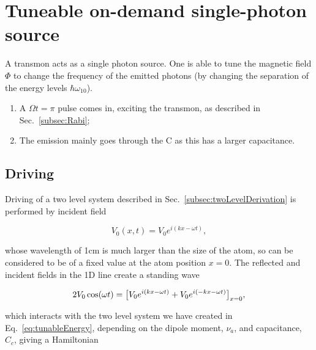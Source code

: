 \section{Tuneable on-demand single-photon source}

 A transmon acts as a single photon source. One is able to tune the magnetic field $ \Phi $ to change the frequency of the emitted photons (by changing the separation of the energy levels $ \hbar\omega_{10} $).

 \begin{enumerate}
 	\item A $ \Omega t = \pi $ pulse comes in, exciting the transmon, as described in Sec.~\ref{subsec:Rabi};
 	\item The emission mainly goes through the C as this has a larger capacitance.
  \end{enumerate}

 

\subsection{Driving}
 Driving of a two level system described in Sec.~\ref{subsec:twoLevelDerivation} is performed by incident field
 
 \[
 	V_0(x,t) = V_0e^{i(kx-\omega t)},
 \]
 
 \noindent whose wavelength of 1cm is much larger than the size of the atom, so can be considered to be of a fixed value at the atom position $ x=0 $. The reflected and incident fields in the 1D line create a standing wave
 
 \[
 	2V_0\cos(\omega t) = \big[V_0e^{i(kx-\omega t)} + V_0e^{i(-kx-\omega t)}\big]_{x=0},
 \]
 
 \noindent which interacts with the two level system we have created in Eq.~\eqref{eq:tunableEnergy}, \alert{depending on the dipole moment, $ \nu_a $, and capacitance, $ C_c $,} giving a Hamiltonian
 
